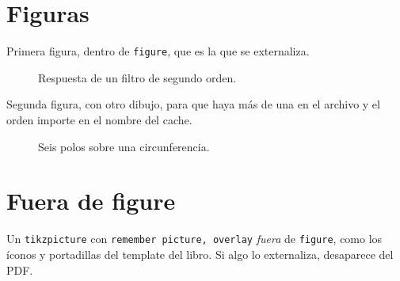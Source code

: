 \documentclass[11pt]{article}
\begin{document}
\section{Figuras}

Primera figura, dentro de \texttt{figure}, que es la que se externaliza.

\begin{figure}[ht]
  \centering
  \caption{Respuesta de un filtro de segundo orden.}
\end{figure}

Segunda figura, con otro dibujo, para que haya más de una en el archivo y el orden importe en el nombre del cache.

\begin{figure}[ht]
  \centering
  \caption{Seis polos sobre una circunferencia.}
\end{figure}

\section{Fuera de figure}

Un \texttt{tikzpicture} con \texttt{remember picture, overlay} \emph{fuera} de \texttt{figure}, como los íconos y portadillas del template del libro. Si algo lo externaliza, desaparece del PDF.

\end{document}

